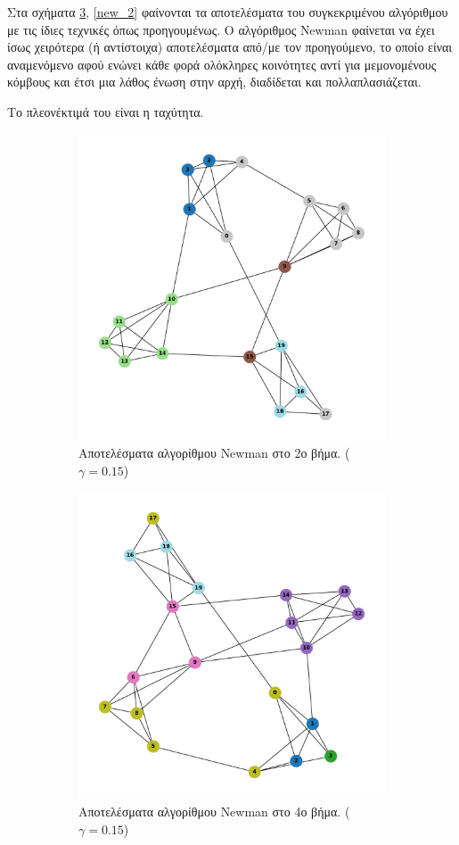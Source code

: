 \documentclass[10pt, letterpaper]{article}
\begin{document}
Στα σχήματα \ref{new_1}, \ref{new_2} φαίνονται τα αποτελέσματα του συγκεκριμένου αλγόριθμου 
με τις ίδιες τεχνικές όπως προηγουμένως. 
Ο αλγόριθμος \textlatin{Newman} φαίνεται να έχει ίσως χειρότερα (ή αντίστοιχα) αποτελέσματα από/με τον 
προηγούμενο, το οποίο είναι αναμενόμενο αφού ενώνει κάθε φορά ολόκληρες κοινότητες 
αντί για μεμονομένους κόμβους και έτσι μια λάθος ένωση στην αρχή, διαδίδεται και πολλαπλασιάζεται.

Το πλεονέκτιμά του είναι η ταχύτητα. 



\begin{figure}[H]
  \begin{subfigure}{0.5\textwidth}
    \centering
    \includegraphics[width=0.6\linewidth]{iterations=1newman.pdf}
    \caption{Αποτελέσματα αλγορίθμου \textlatin{Newman} στο 2ο βήμα. ($\gamma=0.15$)}
    \label{fig:it1new}
  \end{subfigure}
  \begin{subfigure}{0.5\textwidth}
    \centering
    \includegraphics[width=0.6\linewidth]{iterations=3newman.pdf}
    \caption{Αποτελέσματα αλγορίθμου \textlatin{Newman} στο 4ο βήμα. ($\gamma = 0.15$)}
    \label{fig:it3new}
  \end{subfigure}
  \caption{}
  \label{new_1}
\end{figure}
\end{document}
